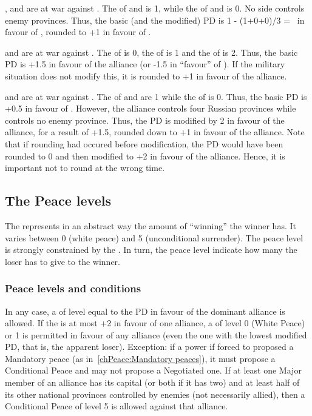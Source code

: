 \begin{exemple}[Rounding PD]
  \SUE, \POL and \TUR are at war against \RUS. The \STAB of \RUS and \SUE is
  1, while the \STAB of \POL and \TUR is 0. No side controls enemy
  provinces. Thus, the basic (and the modified) PD is 1 - (1+0+0)/3 = \td\ in
  favour of \RUS, rounded to +1 in favour of \RUS.

  \smallskip

  \SUE and \TUR are at war against \RUS. The \STAB of \RUS is 0, the \STAB of
  \TUR is 1 and the \STAB of \SUE is 2. Thus, the basic PD is +1.5 in favour
  of the alliance (or -1.5 in ``favour'' of \RUS). If the military situation
  does not modify this, it is rounded to +1 in favour of the alliance.

  \smallskip

  \SUE and \TUR are at war against \RUS. The \STAB of \RUS and \TUR are 1
  while the \STAB of \SUE is 0. Thus, the basic PD is +0.5 in favour of
  \RUS. However, the alliance controls four Russian provinces while \RUS
  controls no enemy province. Thus, the PD is modified by 2 in favour of the
  alliance, for a result of +1.5, rounded down to +1 in favour of the
  alliance. Note that if rounding had occured before modification, the PD
  would have been rounded to 0 and then modified to +2 in favour of the
  alliance. Hence, it is important not to round at the wrong time.
\end{exemple}

\subsection{The Peace levels}
The  represents in an abstract way the amount of
``winning'' the winner has. It varies between 0 (white peace) and 5
(unconditional surrender). The peace level is strongly constrained by the
. In turn, the peace level indicate how many
 the loser has to give to the winner.

\subsubsection{Peace levels and conditions}
\bparag In any case, a  of level equal to the PD in
favour of the dominant alliance is
allowed. %
\bparag If the  is at most +2 in favour of one
alliance, a  of level 0 (White Peace) or 1 is
permitted in favour of any alliance (even the one with the lowest modified PD,
that is, the apparent loser).
\bparag Exception: if a power if forced to proposed a Mandatory peace (as
in~\ref{chPeace:Mandatory peaces}), it must propose a Conditional Peace and
may not propose a Negotiated one.
\bparag If at least one Major member of an alliance has its capital (or both
if it has two) and at least half of its other national provinces controlled by
enemies (not necessarily allied), then a Conditional Peace of level 5 is
allowed against that alliance.


